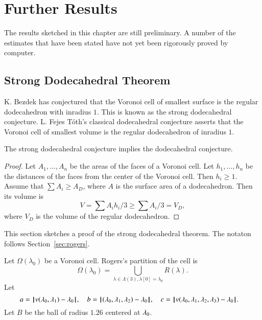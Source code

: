 
\chapter{Further Results}

\begin{note}%
The results sketched in this chapter are still preliminary.  A number of the estimates that have been stated have not yet been rigorously proved by computer. 
\end{note}

\section{Strong Dodecahedral Theorem}

K. Bezdek has conjectured that the Voronoi cell of smallest surface is the regular dodecahedron with inradius $1$.  This is known as the strong dodecahedral conjecture.  L. Fejes T\'oth's classical dodecahedral conjecture asserts that the Voronoi cell of smallest volume is the regular dodecahedron of inradius $1$.

\begin{lemma}  The strong dodecahedral conjecture implies the dodecahedral conjecture.
\end{lemma}

\begin{proof}  Let $A_1,\ldots,A_n$ be the areas of the faces of a Voronoi cell.  Let $h_1,\ldots,h_n$ be the distances of the faces from the center of the Voronoi cell.  Then $h_i\ge 1$.  Assume that $\sum A_i \ge A_D$, where $A$ is the surface area of a dodecahedron.  Then its volume is
$$
V = \sum A_i h_i/3 \ge \sum A_i/3 = V_D,
$$
where $V_D$ is the volume of the regular dodecahedron.
\end{proof}

This section sketches a proof of the strong dodecahedral theorem.  The notaton follows Section~\ref{sec:rogers}.

Let $\Omega(\lambda_0)$ be a Voronoi cell.    Rogers's partition of the cell is
$$
\Omega(\lambda_0) = \bigcup_{\lambda\in \Lambda(3),\lambda[0]=\lambda_0 } R(\lambda).
$$
Let 
$$
a = {\hskip0.1em|\hskip-0.15em|\hskip0.1em} v(\lambda_0,\lambda_1) -   \lambda_0{\hskip0.1em|\hskip-0.15em|\hskip0.1em},\quad
b = {\hskip0.1em|\hskip-0.15em|\hskip0.1em}(\lambda_0,\lambda_1,\lambda_2) -  \lambda_0{\hskip0.1em|\hskip-0.15em|\hskip0.1em},\quad
c = {\hskip0.1em|\hskip-0.15em|\hskip0.1em} v(\lambda_0,\lambda_1,\lambda_2,\lambda_3) -   \lambda_0{\hskip0.1em|\hskip-0.15em|\hskip0.1em}.\quad
$$
Let $B$ be the ball of radius $1.26$ centered at $\lambda_0$.


